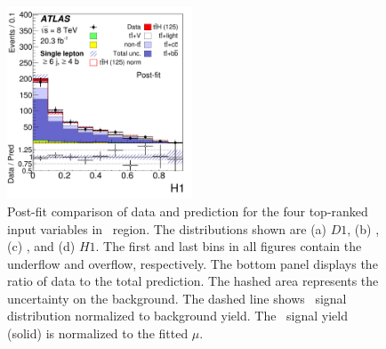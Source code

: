 \begin{figure}[tp]
\begin{center}
\includegraphics[width=0.49\textwidth]{Appendices/Figures_separation/H1_6jincl.pdf}
\caption{Post-fit comparison of data and prediction for the four top-ranked input variables in 
\sixfour\ region. The distributions shown are (a) $D1$, (b) \cent, (c) \ptjetfive, and (d) $H1$.
The first and last bins in all figures contain the underflow and
overflow, respectively. The bottom panel displays the ratio of 
data to the total prediction. The hashed area represents the uncertainty on the background.
The dashed line shows \tth\ signal
distribution normalized to background yield. The \tth\ signal yield (solid) 
is normalized to the fitted $\mu$.}
\label{fig:postinput_lj_3} 
\end{center}
\end{figure}
